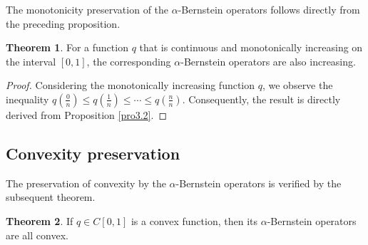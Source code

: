 \documentclass[preprint,12pt]{elsarticle}
\theoremstyle{definition}
\theoremstyle{theorem}
\newtheorem{theorem}{Theorem}
\theoremstyle{lemma}
\theoremstyle{example}
\theoremstyle{remark}
\theoremstyle{prop}
\begin{document}
The monotonicity preservation of the $\alpha$-Bernstein operators follows directly from the preceding proposition.


\begin{theorem}
For a function $q$ that is continuous and monotonically increasing on the interval $[0,1]$, the corresponding $\alpha$-Bernstein operators are also increasing.
\end{theorem}
\begin{proof}

Considering the monotonically increasing function $q$, we observe the inequality $q\left(\frac{0}{n}\right) \leq q\left(\frac{1}{n}\right) \leq \cdots \leq q\left(\frac{n}{n}\right)$. Consequently, the result is directly derived from Proposition \ref{pro3.2}.

\end{proof}






\subsection{Convexity preservation}
The preservation of convexity by the $\alpha$-Bernstein operators is verified by the subsequent theorem.

\begin{theorem}
 If $q \in C[0,1] $ is a convex function, then    its $\alpha$-Bernstein operators are all convex.
 
\end{theorem}
\end{document}
